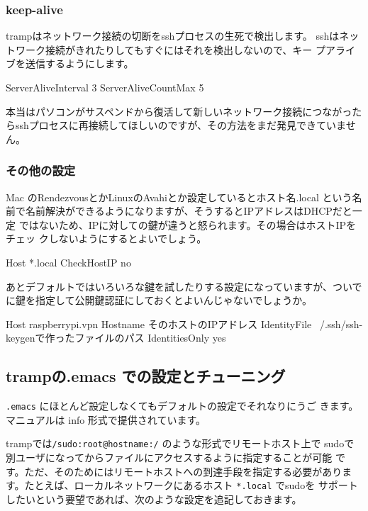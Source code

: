 \documentclass[mingoth,a4paper]{jsarticle}
\begin{document}
\subsubsection{keep-alive}

trampはネットワーク接続の切断をsshプロセスの生死で検出します。
sshはネットワーク接続がきれたりしてもすぐにはそれを検出しないので、キー
プアライブを送信するようにします。

\begin{commandline}
 ServerAliveInterval 3
 ServerAliveCountMax 5
\end{commandline}


本当はパソコンがサスペンドから復活して新しいネットワーク接続につながった
らsshプロセスに再接続してほしいのですが、その方法をまだ発見できていませ
ん。

\subsubsection{その他の設定}

Mac のRendezvousとかLinuxのAvahiとか設定しているとホスト名.local という名
前で名前解決ができるようになりますが、そうするとIPアドレスはDHCPだと一定
ではないため、IPに対しての鍵が違うと怒られます。その場合はホストIPをチェッ
クしないようにするとよいでしょう。

\begin{commandline}
 Host *.local
  CheckHostIP no
\end{commandline}

あとデフォルトではいろいろな鍵を試したりする設定になっていますが、ついで
に鍵を指定して公開鍵認証にしておくとよいんじゃないでしょうか。

\begin{commandline}
 Host raspberrypi.vpn
  Hostname そのホストのIPアドレス
  IdentityFile ~/.ssh/ssh-keygenで作ったファイルのパス
  IdentitiesOnly yes
\end{commandline}


\subsection{trampの.emacs での設定とチューニング}

\texttt{.emacs} にほとんど設定しなくてもデフォルトの設定でそれなりにうご
きます。
マニュアルは info 形式で提供されています\cite{trampinfomanual}。

trampでは\texttt{/sudo:root@hostname:/} のような形式でリモートホスト上で
sudoで別ユーザになってからファイルにアクセスするように指定することが可能
です。ただ、そのためにはリモートホストへの到達手段を指定する必要がありま
す。たとえば、ローカルネットワークにあるホスト \texttt{*.local} でsudoを
サポートしたいという要望であれば、次のような設定を追記しておきます。
\end{document}

